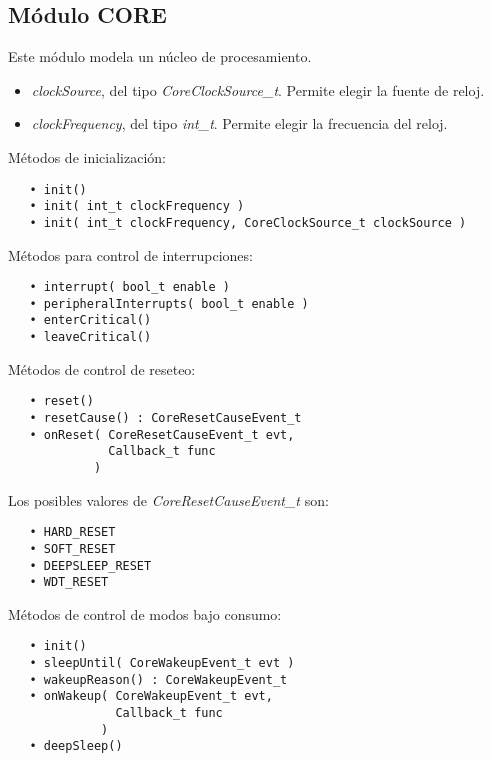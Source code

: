 \subsection{Módulo CORE}

Este módulo modela un núcleo de procesamiento.


\begin{itemize}
\item
\emph{clockSource}, del tipo \emph{CoreClockSource\_t}. Permite elegir la fuente de reloj.
\item
\emph{clockFrequency}, del tipo \emph{int\_t}. Permite elegir la frecuencia del reloj.
\end{itemize}


Métodos de inicialización:

\begin{verbatim}
   • init()
   • init( int_t clockFrequency )
   • init( int_t clockFrequency, CoreClockSource_t clockSource )
\end{verbatim} 

Métodos para control de interrupciones:

\begin{verbatim}
   • interrupt( bool_t enable )
   • peripheralInterrupts( bool_t enable )
   • enterCritical()
   • leaveCritical()
\end{verbatim}  

Métodos de control de reseteo:

\begin{verbatim}
   • reset()
   • resetCause() : CoreResetCauseEvent_t
   • onReset( CoreResetCauseEvent_t evt,
              Callback_t func
            )
\end{verbatim}

Los posibles valores de \emph{CoreResetCauseEvent\_t} son:

\begin{verbatim}
   • HARD_RESET
   • SOFT_RESET
   • DEEPSLEEP_RESET
   • WDT_RESET
\end{verbatim} 

Métodos de control de modos bajo consumo:

\begin{verbatim}
   • init()
   • sleepUntil( CoreWakeupEvent_t evt )
   • wakeupReason() : CoreWakeupEvent_t
   • onWakeup( CoreWakeupEvent_t evt,
               Callback_t func
             )
   • deepSleep()
\end{verbatim}  

